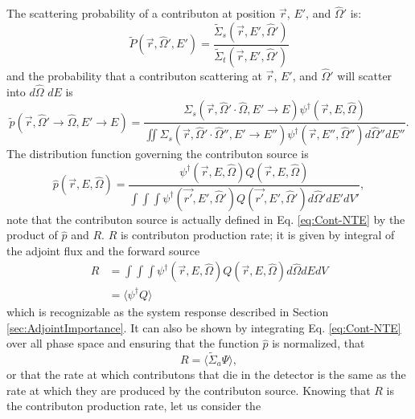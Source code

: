 The scattering probability of a contributon at position $\vec{r}$, $E'$, and
$\hat\Omega'$ is:
\begin{equation}
\widetilde{P}(\vec{r}, \hat\Omega',E') =
         \frac{\widetilde{\Sigma}_{ s }(\vec{r}, E', \hat\Omega')}
       {\widetilde{\Sigma}_{ t }(\vec{r}, E', \hat\Omega')}
\end{equation}
and the probability that a contributon scattering at $\vec{r}$, $E'$,
and $\hat\Omega'$ will scatter into $d\hat\Omega$ $dE$ is
\begin{equation}
\widetilde{p}(\vec{r}, \hat\Omega'\rightarrow\hat\Omega, E' \rightarrow E) =
       \frac{\Sigma_{s}(\vec{r},\hat\Omega'\cdot\hat\Omega,E'\rightarrow E)
       \psi^{\dagger} (\vec{r}, E, \hat\Omega)}
       {\iint \Sigma_{s}(\vec{r},\hat\Omega'\cdot\hat\Omega'',E'\rightarrow
       E'')\psi^{\dagger} (\vec{r}, E'', \hat\Omega'')d\hat\Omega'' dE''}.
\end{equation}
The distribution function governing the contributon source is
\begin{equation}
\hat p(\vec{r}, E, \hat\Omega) =
\frac{\psi^{\dagger}(\vec{r}, E, \hat\Omega) Q(\vec{r},E,\hat\Omega)}
     {\int \int \int \psi^{\dagger}(\vec{r'},E',\hat\Omega')
     Q(\vec{r'},E',\hat\Omega') d\hat\Omega' dE' dV'},
\end{equation}
note that the contributon source is actually defined in Eq.
\eqref{eq:Cont-NTE} by the product of $\hat{p}$
and $R$. $R$ is contributon production rate; it
is given by integral of the adjoint flux and the forward source
\begin{equation}
  \begin{split}
R &= \int \int \int \psi^{\dagger}(\vec{r},E,\hat\Omega)Q(\vec{r},E,\hat\Omega)
    d\hat\Omega dE dV \\
  & = \langle \psi^{\dagger}Q  \rangle
\end{split}
\end{equation}
which is recognizable as the system response described
in Section \ref{sec:AdjointImportance}. It can also be shown by integrating Eq.
\eqref{eq:Cont-NTE} over all phase space and ensuring that the function
$\hat{p}$ is normalized, that
\begin{equation}
  R = \langle \widetilde{\Sigma}_a \Psi \rangle,
  \label{eq:contribprod}
\end{equation}
or that the rate at which contributons that die in the detector is the same as
the rate at which they are produced by the contributon source.
Knowing that $R$ is the contributon production rate, let us consider the
